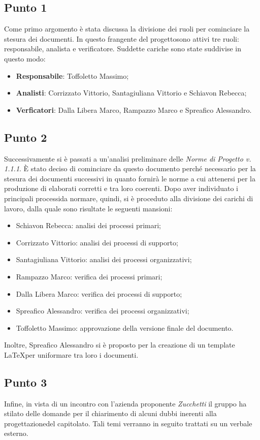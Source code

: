     \subsection{Punto 1}
        Come primo argomento è stata discussa la divisione dei ruoli per cominciare la stesura dei documenti. In questo frangente del progetto\glosp sono attivi tre ruoli: responsabile, analista e verificatore. Suddette cariche sono state suddivise in questo modo:
        \begin{itemize}
            \item \textbf{Responsabile}: Toffoletto Massimo;
            \item \textbf{Analisti}: Corrizzato Vittorio, Santagiuliana Vittorio e Schiavon Rebecca;
            \item \textbf{Verficatori}: Dalla Libera Marco, Rampazzo Marco e Spreafico Alessandro. 
        \end{itemize}
    \subsection{Punto 2}
        Successivamente si è passati a un'analisi preliminare delle \textit{Norme di Progetto v. 1.1.1}. È stato deciso di cominciare da questo documento perché necessario per la stesura dei documenti successivi in quanto fornirà le norme a cui attenersi per la produzione di elaborati corretti e tra loro coerenti. Dopo aver individuato i principali processi\glosp da normare, quindi, si è proceduto alla divisione dei carichi di lavoro, dalla quale sono risultate le seguenti mansioni:
        \begin{itemize}
            \item Schiavon Rebecca: analisi dei processi primari;
            \item Corrizzato Vittorio: analisi dei processi di supporto;
            \item Santagiuliana Vittorio: analisi dei processi organizzativi;
            \item Rampazzo Marco: verifica dei processi primari;
            \item Dalla Libera Marco: verifica dei processi di supporto;
            \item Spreafico Alessandro: verifica dei processi organizzativi;
            \item Toffoletto Massimo: approvazione della versione finale del documento.
        \end{itemize}
        Inoltre, Spreafico Alessandro si è proposto per la creazione di un template \LaTeX per uniformare tra loro i documenti.
    \subsection{Punto 3}
    Infine, in vista di un incontro con l'azienda proponente \textit{Zucchetti} il gruppo ha stilato delle domande per il chiarimento di alcuni dubbi inerenti alla progettazione\glosp del capitolato\glo. Tali temi verranno in seguito trattati su un verbale esterno.